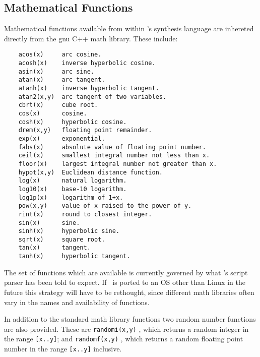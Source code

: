 \subsection{Mathematical Functions}
\label{section:math_functions}
Mathematical functions available from within \tao's synthesis language
are inhereted directly from the gnu C++ math library. These include:

\begin{verbatim}
    acos(x)     arc cosine.
    acosh(x)    inverse hyperbolic cosine.
    asin(x)     arc sine.
    atan(x)     arc tangent.
    atanh(x)    inverse hyperbolic tangent.
    atan2(x,y)  arc tangent of two variables.
    cbrt(x)     cube root.
    cos(x)      cosine.
    cosh(x)     hyperbolic cosine.
    drem(x,y)   floating point remainder.
    exp(x)      exponential.
    fabs(x)     absolute value of floating point number.
    ceil(x)     smallest integral number not less than x.
    floor(x)    largest integral number not greater than x.
    hypot(x,y)  Euclidean distance function.
    log(x)      natural logarithm.
    log10(x)    base-10 logarithm.
    log1p(x)    logarithm of 1+x.
    pow(x,y)    value of x raised to the power of y.
    rint(x)     round to closest integer.
    sin(x)      sine.
    sinh(x)     hyperbolic sine.
    sqrt(x)     square root.
    tan(x)      tangent.
    tanh(x)     hyperbolic tangent.
\end{verbatim}

The set of functions which are available is currently governed by what
\tao's script parser has been told to expect. If \tao\ is ported
to an OS other than Linux in the future this strategy will have to
be rethought, since different math libraries often vary in the names
and availability of functions.

In addition to the standard math library functions two random number
functions are also provided. These are \verb|randomi(x,y)|
,
which returns a random integer in the range \verb|[x..y]|; and \verb|randomf(x,y)|
,
which returns a random floating point number in the range \verb|[x..y]| inclusive.

